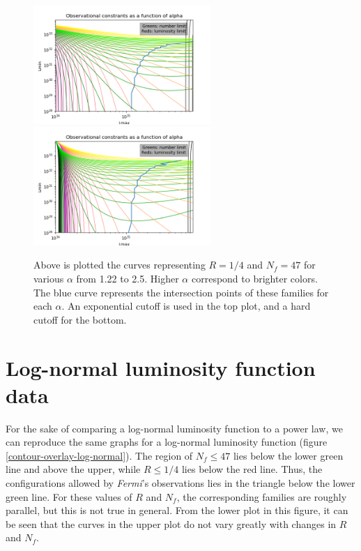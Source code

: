 \documentclass{C://Aliases//Dropbox-MIT//Latex_Templates//personal}
\begin{document}
\begin{figure}[h]
    \centering
    \includegraphics[width=0.6\textwidth]{../../luminosity-models/power-law/step-sensitivity/contour-vary-alpha-exp.png}
    \includegraphics[width=0.6\textwidth]{../../luminosity-models/power-law/step-sensitivity/contour-vary-alpha-hard.png}
    \caption{Above is plotted the curves representing $R=1/4$ and $N_f=47$ for various $\alpha$ from 1.22 to 2.5. Higher $\alpha$ correspond to brighter colors. The blue curve represents the intersection points of these families for each $\alpha$. An exponential cutoff is used in the top plot, and a hard cutoff for the bottom.}
    \label{contour-vary-alpha}
\end{figure}



\section{Log-normal luminosity function data}
For the sake of comparing a log-normal luminosity function to a power law, we can reproduce the same graphs for a log-normal luminosity function (figure \ref{contour-overlay-log-normal}). The region of $N_f \leq 47$ lies below the lower green line and above the upper, while $R \leq 1/4$ lies below the red line. Thus, the configurations allowed by \textit{Fermi}'s observations lies in the triangle below the lower green line. For these values of $R$ and $N_f$, the corresponding families are roughly parallel, but this is not true in general. From the lower plot in this figure, it can be seen that the curves in the upper plot do not vary greatly with changes in $R$ and $N_f$.
\end{document}
